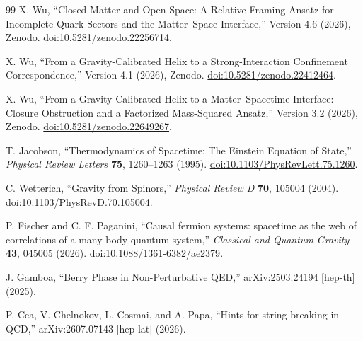 \documentclass[10pt]{article}
\begin{document}
\begin{thebibliography}{99}
X. Wu, ``Closed Matter and Open Space: A Relative-Framing Ansatz for Incomplete Quark Sectors and the Matter--Space Interface,'' Version 4.6 (2026), Zenodo. \href{https://doi.org/10.5281/zenodo.22256714}{doi:10.5281/zenodo.22256714}.

X. Wu, ``From a Gravity-Calibrated Helix to a Strong-Interaction Confinement Correspondence,'' Version 4.1 (2026), Zenodo. \href{https://doi.org/10.5281/zenodo.22412464}{doi:10.5281/zenodo.22412464}.

X. Wu, ``From a Gravity-Calibrated Helix to a Matter--Spacetime Interface: Closure Obstruction and a Factorized Mass-Squared Ansatz,'' Version 3.2 (2026), Zenodo. \href{https://doi.org/10.5281/zenodo.22649267}{doi:10.5281/zenodo.22649267}.

T. Jacobson, ``Thermodynamics of Spacetime: The Einstein Equation of State,'' \emph{Physical Review Letters} \textbf{75}, 1260--1263 (1995). \href{https://doi.org/10.1103/PhysRevLett.75.1260}{doi:10.1103/PhysRevLett.75.1260}.

C. Wetterich, ``Gravity from Spinors,'' \emph{Physical Review D} \textbf{70}, 105004 (2004). \href{https://doi.org/10.1103/PhysRevD.70.105004}{doi:10.1103/PhysRevD.70.105004}.

P. Fischer and C. F. Paganini, ``Causal fermion systems: spacetime as the web of correlations of a many-body quantum system,'' \emph{Classical and Quantum Gravity} \textbf{43}, 045005 (2026). \href{https://doi.org/10.1088/1361-6382/ae2379}{doi:10.1088/1361-6382/ae2379}.

J. Gamboa, ``Berry Phase in Non-Perturbative QED,'' arXiv:2503.24194 [hep-th] (2025).

P. Cea, V. Chelnokov, L. Cosmai, and A. Papa, ``Hints for string breaking in QCD,'' arXiv:2607.07143 [hep-lat] (2026).
\end{thebibliography}
\end{document}

